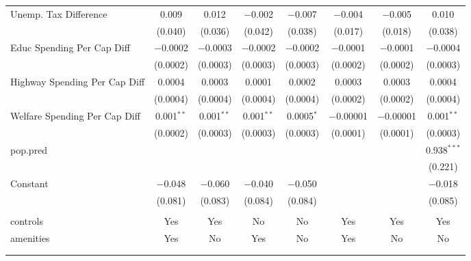 \begin{table}[!htbp]
\begin{tabular}{@{\extracolsep{5pt}}lccccccc}
  Unemp. Tax Difference & 0.009 & 0.012 & $-$0.002 & $-$0.007 & $-$0.004 & $-$0.005 & 0.010 \\ 
  & (0.040) & (0.036) & (0.042) & (0.038) & (0.017) & (0.018) & (0.038) \\ 
  Educ Spending Per Cap Diff & $-$0.0002 & $-$0.0003 & $-$0.0002 & $-$0.0002 & $-$0.0001 & $-$0.0001 & $-$0.0004 \\ 
  & (0.0002) & (0.0003) & (0.0003) & (0.0003) & (0.0002) & (0.0002) & (0.0003) \\ 
  Highway Spending Per Cap Diff & 0.0004 & 0.0003 & 0.0001 & 0.0002 & 0.0003 & 0.0003 & 0.0004 \\ 
  & (0.0004) & (0.0004) & (0.0004) & (0.0004) & (0.0002) & (0.0002) & (0.0004) \\ 
  Welfare Spending Per Cap Diff & 0.001$^{**}$ & 0.001$^{**}$ & 0.001$^{**}$ & 0.0005$^{*}$ & $-$0.00001 & $-$0.00001 & 0.001$^{**}$ \\ 
  & (0.0002) & (0.0003) & (0.0003) & (0.0003) & (0.0001) & (0.0001) & (0.0003) \\ 
  pop.pred &  &  &  &  &  &  & 0.938$^{***}$ \\ 
  &  &  &  &  &  &  & (0.221) \\ 
  Constant & $-$0.048 & $-$0.060 & $-$0.040 & $-$0.050 &  &  & $-$0.018 \\ 
  & (0.081) & (0.083) & (0.084) & (0.084) &  &  & (0.085) \\ 
 \hline \\[-1.8ex] 
controls & Yes & Yes & No & No & Yes & Yes & Yes \\ 
amenities & Yes & No & Yes & No & Yes & No & No \\ 
\hline \\[-1.8ex] 
\hline 
\hline \\[-1.8ex] 
\end{tabular} 
\end{table} 
